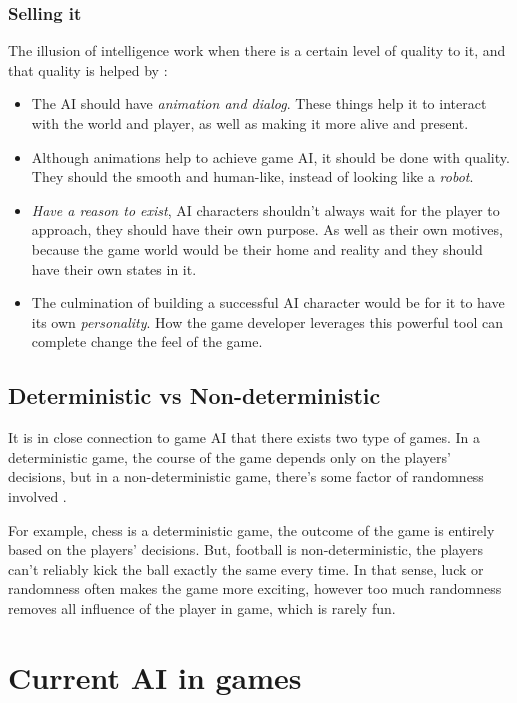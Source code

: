 \documentclass[a4paper, 12pt]{book}
\begin{document}
\subsection{Selling it}
The illusion of intelligence work when there is a certain level of quality to it, and that quality is helped by \cite{IllusionOfIntelligece}:
\begin{itemize}
    \item The AI should have \emph{animation and dialog}. These things help it to interact with the world and player, as well as making it more alive and present.
    \item Although animations help to achieve game AI, it should be done with quality. They should the smooth and human-like, instead of looking like a \emph{robot}.
    \item \emph{Have a reason to exist}, AI characters shouldn't always wait for the player to approach, they should have their own purpose. As well as their own motives, because the game world would be their home and reality and they should have their own states in it.
    \item The culmination of building a successful AI character would be for it to have its own \emph{personality}. How the game developer leverages this powerful tool can complete change the feel of the game.
\end{itemize}


\section{Deterministic vs Non-deterministic}
It is in close connection to game AI that there exists two type of games. In a deterministic game, the course of the game depends only on the players’ decisions, but in a non-deterministic game, there’s some factor of randomness involved \cite{DeepLearningGO}.

For example, chess is a deterministic game, the outcome of the game is entirely based on the players' decisions. But, football is non-deterministic, the players can't reliably kick the ball exactly the same every time. In that sense, luck or randomness often makes the game more exciting, however too much randomness removes all influence of the player in game, which is rarely fun.


\chapter{Current AI in games}
\label{ch2}
\end{document}
